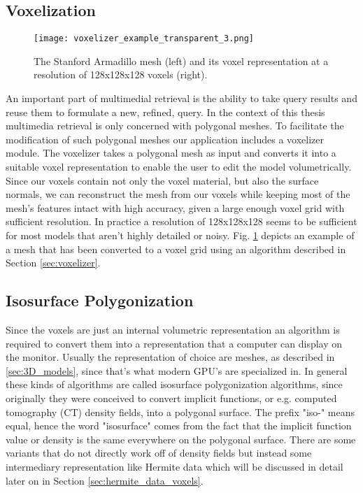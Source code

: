 \subsection{Voxelization}

\hfill

\begin{figure}
\centering
\captionsetup{width=0.8\textwidth}
\texttt{[image: voxelizer\_example\_transparent\_3.png]}
\caption{The Stanford Armadillo mesh \cite{stanford_scan_repo} (left) and its voxel representation at a resolution of 128x128x128 voxels (right).}
\label{fig:voxelizer_example}
\end{figure}

An important part of multimedial retrieval is the ability to take query results and reuse them to formulate a new, refined, query. In the context of this thesis multimedia retrieval
is only concerned with polygonal meshes. To facilitate the modification of such polygonal meshes our application includes a voxelizer module. The voxelizer takes a polygonal
mesh as input and converts it into a suitable voxel representation to enable the user to edit the model volumetrically. Since
our voxels contain not only the voxel material, but also the surface normals, we can reconstruct the mesh from our voxels while keeping most of the mesh's features intact with high accuracy, given
a large enough voxel grid with sufficient resolution. In practice a resolution of 128x128x128 seems to be sufficient for most models that aren't highly detailed or noisy.
Fig. \ref{fig:voxelizer_example} depicts an example of a mesh that has been converted to a voxel grid using an algorithm described in Section \ref{sec:voxelizer}.

\subsection{Isosurface Polygonization}

Since the voxels are just an internal volumetric representation an algorithm is required to convert them into a representation that a computer can display on the monitor. Usually the representation of choice are meshes, as described in \ref{sec:3D_models}, since that's what modern GPU's are specialized in. In general these kinds of algorithms are called isosurface polygonization algorithms, since originally they were conceived to convert implicit functions, or e.g.
computed tomography (CT) density fields, into a polygonal surface. The prefix "iso-" means equal, hence the word "isosurface" comes from the fact that the implicit function value or density is the same everywhere on the polygonal surface. There are some variants that do not directly work off of density fields but instead some intermediary representation like Hermite data which will be discussed in detail later on in Section \ref{sec:hermite_data_voxels}.

